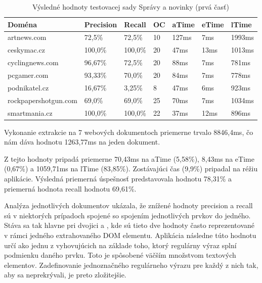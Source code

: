 \begin{table}[hbt]
\caption{Výsledné hodnoty testovacej sady Správy a novinky (prvá časť)}
\centering
\begin{tabular}{|l|l|l|l|l|l|l|}
\hline
Doména                  & Precision & Recall  & OC & aTime & eTime & lTime  \\ \hline
artnews.com             & 72,5\%    & 72,5\%  & 10 & 127ms & 7ms   & 1993ms \\ \hline
ceskymac.cz             & 100,0\%   & 100,0\% & 20 & 47ms  & 13ms  & 1013ms \\ \hline
cyclingnews.com         & 96,67\%   & 72,5\%  & 20 & 88ms  & 7ms   & 781ms  \\ \hline
pcgamer.com             & 93,33\%   & 70,0\%  & 20 & 84ms  & 7ms   & 778ms  \\ \hline
podnikatel.cz           & 16,67\%   & 3,25\%  & 8  & 47ms  & 6ms   & 923ms  \\ \hline
rockpapershotgun.com    & 69,0\%    & 69,0\%  & 25 & 70ms  & 7ms   & 1034ms \\ \hline
smartmania.cz           & 100,0\%   & 100,0\% & 22 & 37ms  & 12ms  & 896ms  \\ \hline
\end{tabular}
\end{table}

Vykonanie extrakcie na 7 webových dokumentoch priemerne trvalo 8846,4ms, čo nám dáva hodnotu 1263,77ms na jeden dokument. 

Z tejto hodnoty pripadá priemerne 70,43ms na aTime (5,58\%), 8,43ms na eTime (0,67\%) a 1059,71ms na lTime (83,85\%). Zostávajúci čas (9,9\%) pripadal na réžiu aplikácie. Výsledná priemerná úspešnosť predstavovala hodnotu 78,31\% a priemerná hodnota recall hodnotu 69,61\%. 

\bigskip

Analýza jednotlivých dokumentov ukázala, že znížené hodnoty precision a recall sú v niektorých prípadoch spojené so spojením jednotlivých prvkov do jedného. Stáva sa tak hlavne pri dvojici  a , kde sú tieto dve hodnoty často reprezentované v rámci jedného extrahovaného DOM elementu. Aplikácia následne túto hodnotu určí ako jednu z vyhovujúcich na základe toho, ktorý regulárny výraz splní podmienku daného prvku. Toto je spôsobené väčším množstvom textových elementov. Zadefinovanie jednoznačného regulárneho výrazu pre každý z nich tak, aby sa neprekrývali, je preto zložitejšie.

\newpage

